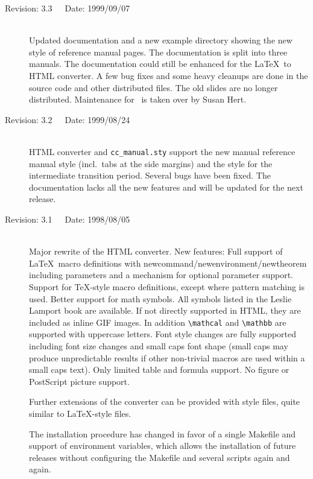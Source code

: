 \documentclass[11pt]{article}
\begin{document}
\begin{description}
    \item[Revision: 3.3~~~Date: 1999/09/07]~\\[3mm]
    Updated documentation and a new example directory showing the new
    style of reference manual pages. The documentation is split into
    three manuals. The documentation could still be enhanced for the
    \LaTeX\ to HTML converter. A few bug fixes and some heavy cleanups
    are done in the source code and other distributed files. The old
    slides are no longer distributed. Maintenance for \cgal\ is taken
    over by Susan Hert.

    \item[Revision: 3.2~~~Date: 1999/08/24]~\\[3mm]
    HTML converter and \verb+cc_manual.sty+ support the new manual
    reference manual style (incl.~tabs at the side margins) and
    the style for the intermediate transition period. Several bugs
    have been fixed. The documentation lacks all the new features
    and will be updated for the next release.

    \item[Revision: 3.1~~~Date: 1998/08/05]~\\[3mm]
    Major rewrite of the HTML converter. New features: Full support of
    \LaTeX\ macro definitions with newcommand/newenvironment/newtheorem
    including parameters and a mechanism for optional parameter support.
    Support for \TeX-style macro definitions, except where pattern
    matching is used. Better support for math symbols. All symbols listed
    in the Leslie Lamport book are available. If not directly supported in
    HTML, they are included as inline GIF images. In addition
    \verb+\mathcal+ and \verb+\mathbb+ are supported with uppercase letters.
    Font style changes are fully supported including font size changes and
    small caps font shape (small caps may produce unpredictable results
    if other non-trivial macros are used within a small caps text).
    Only limited table and formula support. No figure or PostScript
    picture support.

    Further extensions of the converter can be provided with style files,
    quite similar to \LaTeX-style files.

    The installation procedure has changed in favor of a single Makefile and
    support of environment variables, which allows the installation of future
    releases without configuring the Makefile and several scripts again and
    again.



\end{description}
\end{document}
